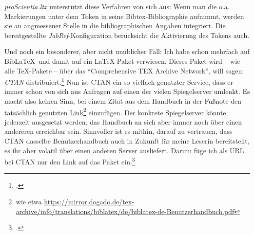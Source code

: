 \emph{proScientia.ltx} unterstützt diese Verfahren von sich aus: Wenn man die o.a. Markierungen unter dem Token  in seine Bibtex-Bibliographie aufnimmt, werden sie an angmessener Stelle in die bibliographischen Angaben integriert. Die bereitgestellte \emph{JabRef}-Konfiguration berücksicht die Aktivierung des Tokens auch.

Und noch ein besonderer, aber nicht unüblicher Fall: Ich habe schon mehrfach auf Bib\LaTeX\ und damit auf ein \LaTeX-Paket verwiesen. Dieses Paket wird -- wie alle \TeX-Pakete -- über das \enquote{Comprehensive TEX Archive Network}, will sagen: \emph{CTAN} distribuiert.\footcite[vgl.][]{Ctan2022a} Nun ist CTAN ein so vielfach genutzter Service, dass er immer schon von sich aus Anfragen auf einen der vielen Spiegelserver umlenkt. Es macht also keinen Sinn, bei einem Zitat aus dem Handbuch in der Fußnote den tatsächlich genutzten Link\footnote{wie etwa \href{https://mirror.dogado.de/tex-archive/info/translations/biblatex/de/biblatex-de-Benutzerhandbuch.pdf}{https://mirror.dogado.de/tex-archive/info/translations/biblatex/de/biblatex-de-Benutzerhandbuch.pdf}} einzufügen. Der konkrete Spiegelserver könnte jederzeit ausgesetzt werden, das Handbuch an sich aber immer noch über einen andereren erreichbar sein. Sinnvoller ist es mithin, darauf zu vertrauen, dass CTAN dasselbe Benutzerhandbuch auch in Zukunft für meine Leserin bereitstellt, es ihr aber volatil über einen anderen Server ausliefert. Darum füge ich als URL bei CTAN nur den Link auf das Paket ein.\footcite[vgl][]{KiWeLe2021a}

%
